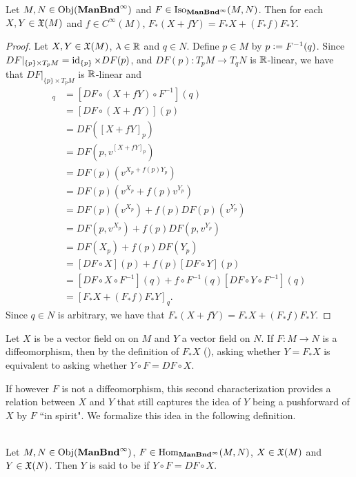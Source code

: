 \documentclass{book}
\begin{document}
\begin{ex}
	Let $M, N \in \operatorname{Obj}(\operatorname*{\text{\textbf{ManBnd}}^{\infty}})$ and $F \in \operatorname{Iso}_{\operatorname*{\text{\textbf{ManBnd}}^{\infty}}}(M, N)$. Then for each $X, Y \in \mathfrak{X}(M)$ and $f \in C^{\infty}(M)$, $F_*(X + f Y) = F_*X + (F_*f) F_*Y$.
\end{ex}

\begin{proof}
	Let $X, Y \in \mathfrak{X}(M)$, $\lambda \in \mathbb{R}$ and $q \in N$. Define $p \in M$ by $p \vcentcolon= F^{-1}(q)$. Since $DF|_{\{p\} \times T_pM} = \operatorname{id}_{\{p\}} \times DF(p)$, and $DF(p): T_pM \rightarrow T_qN$ is $\mathbb{R}$-linear, we have that $DF|_{\{p\} \times T_pM} $ is $\mathbb{R}$-linear and 
	\begin{align*}
		[F_*(X + f Y)]_q
		& = [DF \circ (X + f Y) \circ F^{-1}](q) \\
		& = [DF \circ (X + f Y)](p) \\
		& = DF([X + f Y]_p) \\
		& = DF(p, v^{[X + f Y]_p}) \\
		& = DF(p)(v^{X_p + f(p) Y_p}) \\
		& = DF(p)(v^{X_p} + f(p) v^{Y_p}) \\
		& = DF(p)(v^{X_p}) + f(p) DF(p)(v^{Y_p}) \\
		& = DF(p, v^{X_p}) + f(p) DF(p, v^{Y_p}) \\
		& = DF(X_p) + f(p) DF (Y_p) \\
		& = [DF \circ X](p) + f(p) [DF \circ Y](p) \\
		& = [DF \circ X \circ F^{-1}](q) + f \circ F^{-1}(q) [DF \circ Y \circ F^{-1}](q) \\
		& = [F_* X +  (F_*f)  F_* Y]_q.
	\end{align*}
	Since $q \in N$ is arbitrary, we have that $F_*(X + f Y) = F_* X + (F_*f) F_* Y$.
\end{proof}

Let $X$ is be a vector field on on $M$ and $Y$ a vector field on $N$. If $F:M \rightarrow N$ is a diffeomorphism, then by the definition of $F_*X$ (), asking whether $Y = F_*X$ is equivalent to asking whether $Y \circ F = DF \circ X$. 

If however $F$ is not a diffeomorphism, this second characterization provides a relation between $X$ and $Y$ that still captures the idea of $Y$ being a pushforward of $X$ by $F$ ``in spirit". We formalize this idea in the following definition.

\begin{defn}  \\
	Let $M, N \in \operatorname{Obj}(\operatorname*{\text{\textbf{ManBnd}}^{\infty}})$, $F \in \operatorname{Hom}_{\operatorname*{\text{\textbf{ManBnd}}^{\infty}}}(M, N)$, $X \in \mathfrak{X}(M)$ and $Y \in \mathfrak{X}(N)$. Then $Y$ is said to be  if $Y \circ F = DF \circ X$.
\end{defn}
\end{document}
